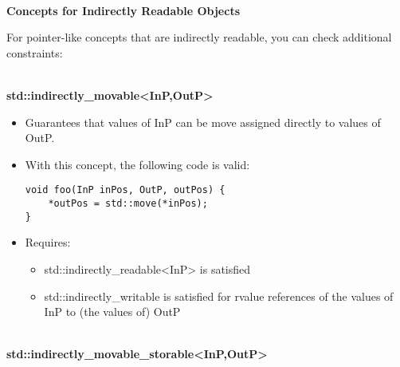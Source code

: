 \noindent
\hspace*{\fill} \\ %
\textbf{Concepts for Indirectly Readable Objects}

For pointer-like concepts that are indirectly readable, you can check additional constraints:

\noindent
\hspace*{\fill} \\ %
\textbf{std::indirectly\_movable<InP,OutP>}

\begin{itemize}
\item
Guarantees that values of InP can be move assigned directly to values of OutP.

\item
With this concept, the following code is valid:

\begin{lstlisting}[style=styleCXX]
void foo(InP inPos, OutP, outPos) {
	*outPos = std::move(*inPos);
}
\end{lstlisting}

\item
Requires:
\begin{itemize}
\item
std::indirectly\_readable<InP> is satisfied

\item
std::indirectly\_writable is satisfied for rvalue references of the values of InP to (the values of) OutP
\end{itemize}
\end{itemize}

\noindent
\hspace*{\fill} \\ %
\textbf{std::indirectly\_movable\_storable<InP,OutP>}

